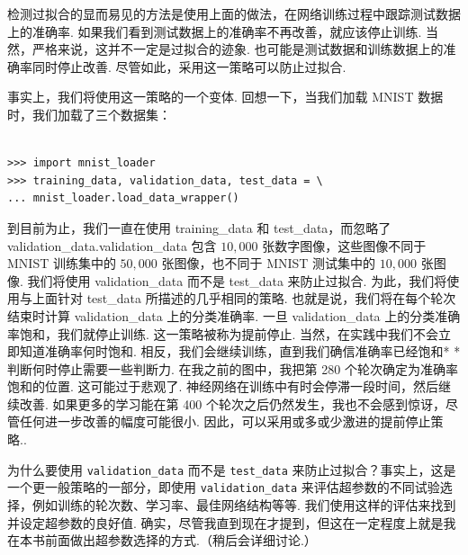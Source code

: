 检测过拟合的显而易见的方法是使用上面的做法，在网络训练过程中跟踪测试数据上的准确率. 如果我们看到测试数据上的准确率不再改善，就应该停止训练. 当然，严格来说，这并不一定是过拟合的迹象. 也可能是测试数据和训练数据上的准确率同时停止改善. 尽管如此，采用这一策略可以防止过拟合.

事实上，我们将使用这一策略的一个变体. 回想一下，当我们加载 MNIST 数据时，我们加载了三个数据集：

\begin{lstlisting}

>>> import mnist_loader
>>> training_data, validation_data, test_data = \
... mnist_loader.load_data_wrapper()

\end{lstlisting}

到目前为止，我们一直在使用 training\_\allowbreak{}data 和 test\_\allowbreak{}data，而忽略了 validation\_\allowbreak{}data.validation\_\allowbreak{}data 包含 $10,000$ 张数字图像，这些图像不同于 MNIST 训练集中的 $50,000$ 张图像，也不同于 MNIST 测试集中的 $10,000$ 张图像. 我们将使用 validation\_\allowbreak{}data 而不是 test\_\allowbreak{}data 来防止过拟合. 为此，我们将使用与上面针对 test\_\allowbreak{}data 所描述的几乎相同的策略. 也就是说，我们将在每个轮次结束时计算 validation\_\allowbreak{}data 上的分类准确率. 一旦 validation\_\allowbreak{}data 上的分类准确率饱和，我们就停止训练. 这一策略被称为提前停止\label{term:56}. 当然，在实践中我们不会立即知道准确率何时饱和. 相反，我们会继续训练，直到我们确信准确率已经饱和* *判断何时停止需要一些判断力. 在我之前的图中，我把第 280 个轮次确定为准确率饱和的位置. 这可能过于悲观了. 神经网络在训练中有时会停滞一段时间，然后继续改善. 如果更多的学习能在第 400 个轮次之后仍然发生，我也不会感到惊讶，尽管任何进一步改善的幅度可能很小. 因此，可以采用或多或少激进的提前停止策略..

为什么要使用 \texttt{validation\_\allowbreak{}data} 而不是 \texttt{test\_\allowbreak{}data} 来防止过拟合？事实上，这是一个更一般策略的一部分，即使用 \texttt{validation\_\allowbreak{}data} 来评估超参数的不同试验选择，例如训练的轮次数、学习率、最佳网络结构等等. 我们使用这样的评估来找到并设定超参数的良好值. 确实，尽管我直到现在才提到，但这在一定程度上就是我在本书前面做出超参数选择的方式.（稍后会详细讨论.）

